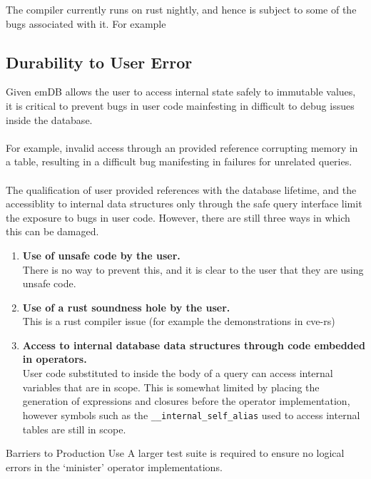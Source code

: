 The \emdb compiler currently runs on rust nightly, and hence is subject to some of the bugs associated with it.
For example


\subsection{Durability to User Error}
Given emDB allows the user to access internal state safely to immutable values, it is critical to
prevent bugs in user code mainfesting in difficult to debug issues inside the database.
\\
\\ For example, invalid access through an \emdb provided reference corrupting memory in a table,
resulting in a difficult bug manifesting in failures for unrelated queries.
\\
\\ The qualification of user provided references with the database lifetime, and the accessiblity to
internal data structures only through the safe query interface limit the exposure to bugs in user code.
However, there are still three ways in which this can be damaged.
\begin{enumerate}
    \item {
          \textbf{Use of unsafe code by the user.} \\
          There is no way to prevent this, and it is clear to the user that they are using unsafe code.
          }
    \item {
          \textbf{Use of a rust soundness hole by the user.} \\
          This is a rust compiler issue (for example the demonstrations in cve-rs\cite{CVERS})
          }
    \item {
          \textbf{Access to internal database data structures through code embedded in operators.} \\
          User code substituted to inside the body of a query
          can access internal variables that are in scope. This is somewhat limited by placing the generation of expressions and closures
          before the operator implementation, however symbols such as the \texttt{__internal_self_alias} used to access internal
          tables are still in scope.
          }
\end{enumerate}

\begin{futurebox}{Barriers to Production Use}
    A larger test suite is required to ensure no logical errors in the `minister' operator implementations.
\end{futurebox}

